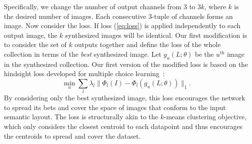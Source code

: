 
Specifically, we change the number of output channels from $3$ to $3k$, where $k$ is the desired number of images. Each consecutive 3-tuple of channels forms an image. Now consider the loss. If loss (\ref{eq:loss}) is applied independently to each output image, the $k$ synthesized images will be identical. Our first modification is to consider the set of $k$ outputs together and define the loss of the whole collection in terms of the \emph{best} synthesized image. Let $g_u(L;\theta)$ be the $u^{\text{th}}$ image in the synthesized collection. Our first version of the modified loss is based on the hindsight loss developed for multiple choice learning~\cite{Guzman-Rivera2012}:
\begin{equation}
\min_u{\sum_l{\lambda_l\| \Phi_l(I)-\Phi_l(g_u(L;\theta))\|_1}}.
\label{eq:loss-diverse1}
\end{equation}
By considering only the best synthesized image, this loss encourages the network to spread its bets and cover the space of images that conform to the input semantic layout. The loss is structurally akin to the $k$-means clustering objective, which only considers the closest centroid to each datapoint and thus encourages the centroids to spread and cover the dataset.


